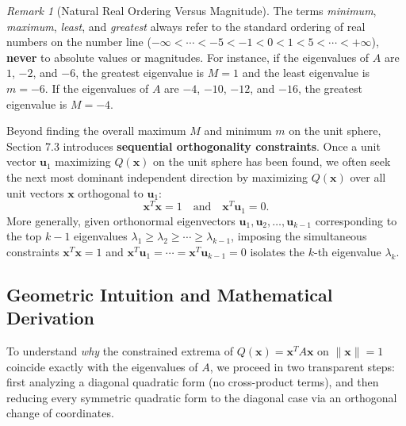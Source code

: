 \documentclass[11pt, letterpaper]{article}
\theoremstyle{definition}
\theoremstyle{remark}
\newtheorem{remark}{Remark}[section]
\begin{document}
\begin{remark}[Natural Real Ordering Versus Magnitude]
The terms \emph{minimum}, \emph{maximum}, \emph{least}, and \emph{greatest} always refer to the standard ordering of real numbers on the number line ($-\infty < \cdots < -5 < -1 < 0 < 1 < 5 < \cdots < +\infty$), \textbf{never} to absolute values or magnitudes. For instance, if the eigenvalues of $A$ are $1$, $-2$, and $-6$, the greatest eigenvalue is $M = 1$ and the least eigenvalue is $m = -6$. If the eigenvalues of $A$ are $-4$, $-10$, $-12$, and $-16$, the greatest eigenvalue is $M = -4$.
\end{remark}

Beyond finding the overall maximum $M$ and minimum $m$ on the unit sphere, Section 7.3 introduces \textbf{sequential orthogonality constraints}. Once a unit vector $\mathbf{u}_1$ maximizing $Q(\mathbf{x})$ on the unit sphere has been found, we often seek the next most dominant independent direction by maximizing $Q(\mathbf{x})$ over all unit vectors $\mathbf{x}$ orthogonal to $\mathbf{u}_1$:
\[
\mathbf{x}^T \mathbf{x} = 1 \quad \text{and} \quad \mathbf{x}^T \mathbf{u}_1 = 0.
\]
More generally, given orthonormal eigenvectors $\mathbf{u}_1, \mathbf{u}_2, \dots, \mathbf{u}_{k-1}$ corresponding to the top $k-1$ eigenvalues $\lambda_1 \ge \lambda_2 \ge \cdots \ge \lambda_{k-1}$, imposing the simultaneous constraints $\mathbf{x}^T \mathbf{x} = 1$ and $\mathbf{x}^T \mathbf{u}_1 = \cdots = \mathbf{x}^T \mathbf{u}_{k-1} = 0$ isolates the $k$-th eigenvalue $\lambda_k$.

\subsection{Geometric Intuition and Mathematical Derivation}

To understand \emph{why} the constrained extrema of $Q(\mathbf{x}) = \mathbf{x}^T A \mathbf{x}$ on $\|\mathbf{x}\| = 1$ coincide exactly with the eigenvalues of $A$, we proceed in two transparent steps: first analyzing a diagonal quadratic form (no cross-product terms), and then reducing every symmetric quadratic form to the diagonal case via an orthogonal change of coordinates.
\end{document}
